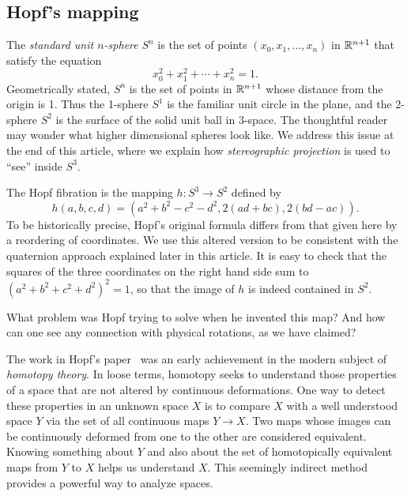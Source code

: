 \documentclass[11pt]{article}
\newcommand{\R}{\Bbb R}
\begin{document}
\subsection*{Hopf's mapping}

The {\em standard unit $n$-sphere} $S^n$
is the set of points $(x_0,x_1,\ldots,x_{n})$ in $\R^{n+1}$ that
satisfy the equation
$$x_0^2+x_1^2+\cdots+x_{n}^2=1.$$ Geometrically stated, $S^n$ is the set
of points in $\R^{n+1}$ whose distance from the origin is 1.  Thus the
1-sphere $S^1$ is the familiar unit circle in the plane, and the
2-sphere $S^2$ is the surface of the solid unit ball in
3-space.
The thoughtful reader may wonder what higher dimensional spheres look
like.  We address this issue at the end of this article, where we
explain how {\em stereographic projection} is used to ``see'' inside 
$S^3$.

The Hopf fibration is the mapping
$h\colon S^3\to S^2$ defined by
\begin{equation}\label{hopfdef}
h(a,b,c,d)=(a^2+b^2-c^2-d^2,2(ad+bc),2(bd-ac)).
\end{equation}
To be historically precise, Hopf's original formula differs from that
given here by a reordering of coordinates.  We use this altered version
to be consistent with the quaternion approach explained later in this
article.  It is easy to check that the squares of the three coordinates
on the right hand side sum to $(a^2+b^2+c^2+d^2)^2=1$, so that the image
of $h$ is indeed contained in $S^2$.

What problem was Hopf trying to solve when he invented this map?  And
how can one see any connection with physical rotations, as we have
claimed?

The work in Hopf's paper~\cite{hopforig} was an early achievement in the
modern subject of {\em homotopy theory}.  In loose terms, homotopy seeks
to understand those properties of a space that are not altered by
continuous deformations.  One way to detect these properties 
in an unknown space $X$ is to compare $X$ with a well understood space $Y$ via
the set of all continuous maps $Y\to X$.  Two maps whose images can be
continuously deformed from one to the other are considered equivalent.
Knowing something about $Y$ and also about the set of homotopically
equivalent maps from $Y$ to $X$ helps us understand $X$.  This seemingly
indirect method provides a powerful way to analyze spaces.
\end{document}
